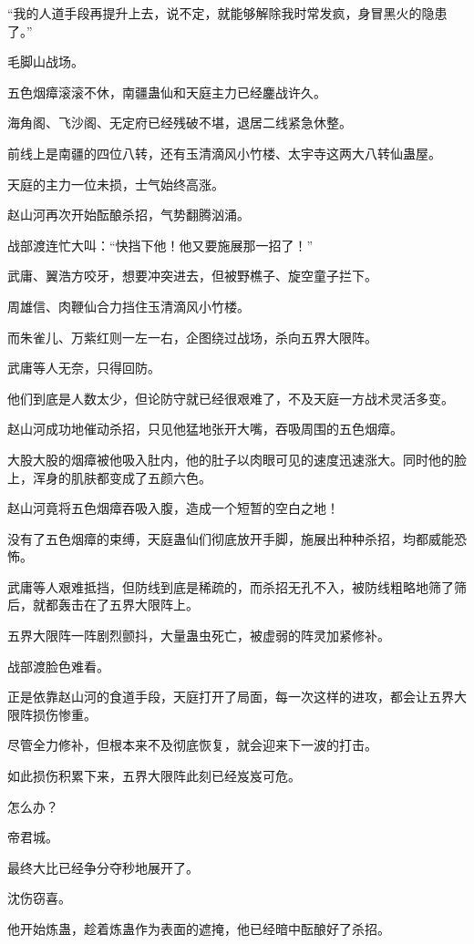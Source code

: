 \begin{this_body}
“我的人道手段再提升上去，说不定，就能够解除我时常发疯，身冒黑火的隐患了。”

毛脚山战场。

五色烟瘴滚滚不休，南疆蛊仙和天庭主力已经鏖战许久。

海角阁、飞沙阁、无定府已经残破不堪，退居二线紧急休整。

前线上是南疆的四位八转，还有玉清滴风小竹楼、太宇寺这两大八转仙蛊屋。

天庭的主力一位未损，士气始终高涨。

赵山河再次开始酝酿杀招，气势翻腾汹涌。

战部渡连忙大叫：“快挡下他！他又要施展那一招了！”

武庸、翼浩方咬牙，想要冲突进去，但被野樵子、旋空童子拦下。

周雄信、肉鞭仙合力挡住玉清滴风小竹楼。

而朱雀儿、万紫红则一左一右，企图绕过战场，杀向五界大限阵。

武庸等人无奈，只得回防。

他们到底是人数太少，但论防守就已经很艰难了，不及天庭一方战术灵活多变。

赵山河成功地催动杀招，只见他猛地张开大嘴，吞吸周围的五色烟瘴。

大股大股的烟瘴被他吸入肚内，他的肚子以肉眼可见的速度迅速涨大。同时他的脸上，浑身的肌肤都变成了五颜六色。

赵山河竟将五色烟瘴吞吸入腹，造成一个短暂的空白之地！

没有了五色烟瘴的束缚，天庭蛊仙们彻底放开手脚，施展出种种杀招，均都威能恐怖。

武庸等人艰难抵挡，但防线到底是稀疏的，而杀招无孔不入，被防线粗略地筛了筛后，就都轰击在了五界大限阵上。

五界大限阵一阵剧烈颤抖，大量蛊虫死亡，被虚弱的阵灵加紧修补。

战部渡脸色难看。

正是依靠赵山河的食道手段，天庭打开了局面，每一次这样的进攻，都会让五界大限阵损伤惨重。

尽管全力修补，但根本来不及彻底恢复，就会迎来下一波的打击。

如此损伤积累下来，五界大限阵此刻已经岌岌可危。

怎么办？

帝君城。

最终大比已经争分夺秒地展开了。

沈伤窃喜。

他开始炼蛊，趁着炼蛊作为表面的遮掩，他已经暗中酝酿好了杀招。


\end{this_body}
